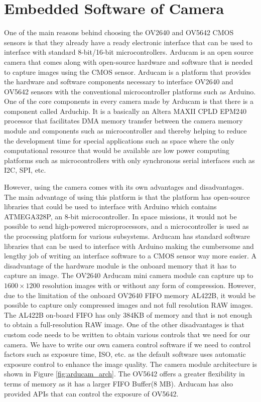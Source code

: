 \section{Embedded Software of Camera}
One of the main reasons behind choosing the OV2640 and OV5642 CMOS sensors is that they already have a ready electronic interface that can be used to interface with standard 8-bit/16-bit microcontrollers. Arducam is an open source camera that comes along with open-source hardware and software that is needed to capture images using the CMOS sensor. Arducam is a platform that provides the hardware and software components necessary to interface OV2640 and OV5642 sensors with the conventional microcontroller platforms such as Arduino. One of the core components in every camera made by Arducam is that there is a component called Arduchip\cite{Arduchip}. It is a basically an Altera MAXII CPLD EPM240 processor that facilitates DMA memory transfer between the camera memory module and components such as microcontroller and thereby helping to reduce the development time for special applications such as space where the only computational resource that would be available are low power computing platforms such as microcontrollers with only synchronous serial interfaces such as I2C, SPI, etc. 

However, using the camera comes with its own advantages and disadvantages. The main advantage of using this platform is that the platform has open-source libraries that could be used to interface with Arduino which contains ATMEGA328P, an 8-bit microcontroller. In space missions, it would not be possible to send high-powered microprocessors, and a microcontroller is used as the processing platform for various subsystems. Arducam has standard software libraries that can be used to interface with Arduino making the cumbersome and lengthy job of writing an interface software to a CMOS sensor way more easier.  A disadvantage of the hardware module is the onboard memory that it has to capture an image. The OV2640 Arducam mini camera module can capture up to $1600 \times 1200$ resolution images with or without any form of compression. However, due to the limitation of the onboard OV2640 FIFO memory AL422B, it would be possible to capture only compressed images and not full resolution RAW images. The AL422B on-board FIFO has only 384KB of memory and that is not enough to obtain a full-resolution RAW image. One of the other disadvantages is that custom code needs to be written to obtain various controls that we need for our camera. We have to write our own camera control software if we need to control factors such as exposure time, ISO, etc. as the default software uses automatic exposure control to enhance the image quality. The camera module architecture is shown in Figure \ref{fig:arducam_arch}. The OV5642 offers a greater flexibility in terms of memory as it has a larger FIFO Buffer(8 MB). Arducam has also provided APIs that can control the exposure of OV5642.

